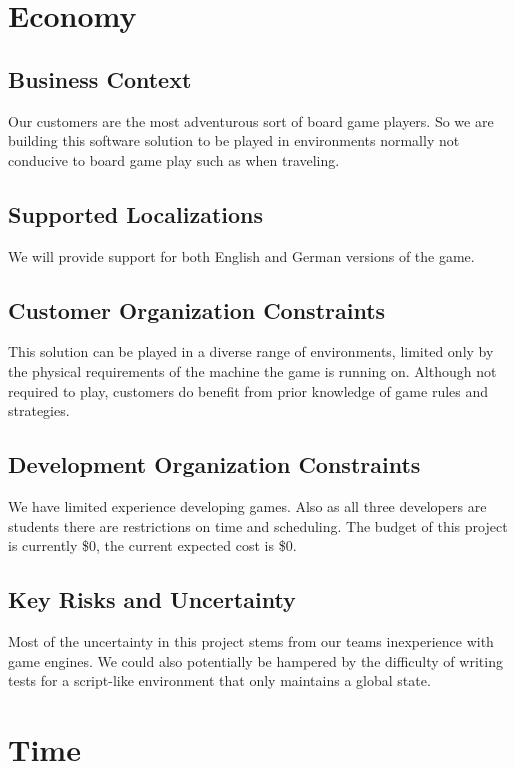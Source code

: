 \documentclass[12pt]{article}
\begin{document}
\section{Economy}

\subsection{Business Context}
Our customers are the most adventurous sort of board game players. So we are building this software solution to be played in environments normally not conducive to board game play such as when traveling. 

\subsection{Supported Localizations}
We will provide support for both English and German versions of the game.

\subsection{Customer Organization Constraints}
This solution can be played in a diverse range of environments, limited only by the physical requirements of the machine the game is running on. Although not required to play, customers do benefit from prior knowledge of game rules and strategies.

\subsection{Development Organization Constraints}
We have limited experience developing games. Also as all three developers are students there are restrictions on time and scheduling. The budget of this project is currently \$0, the current expected cost is \$0.

\subsection{Key Risks and Uncertainty}
Most of the uncertainty in this project stems from our teams inexperience with game engines. We could also potentially be hampered by the difficulty of writing tests for a script-like environment that only maintains a global state. 

\section{Time}
\end{document}
